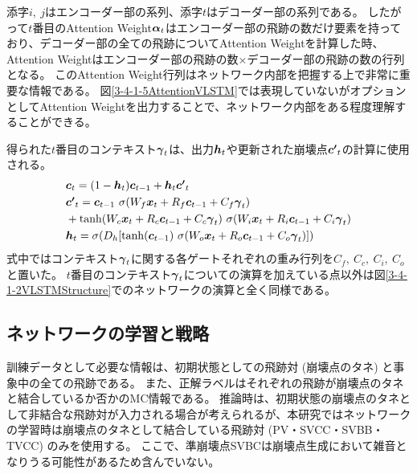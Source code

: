添字$i,\ j$はエンコーダー部の系列、添字$t$はデコーダー部の系列である。
したがって$t$番目のAttention Weight${\mbox{\boldmath{$\alpha$}}}_{t}$はエンコーダー部の飛跡の数だけ要素を持っており、デコーダー部の全ての飛跡についてAttention Weightを計算した時、Attention Weightはエンコーダー部の飛跡の数$\times$デコーダー部の飛跡の数の行列となる。
このAttention Weight行列はネットワーク内部を把握する上で非常に重要な情報である。
図\ref{3-4-1-5AttentionVLSTM}では表現していないがオプションとしてAttention Weightを出力することで、ネットワーク内部をある程度理解することができる。

得られた$t$番目のコンテキスト${\mbox{\boldmath{$\gamma$}}}_{t}$は、出力${\mbox{\boldmath{$h$}}}_{t}$や更新された崩壊点${\mbox{\boldmath{$c'$}}}_{t}$の計算に使用される。
\begin{equation}
 \begin{split}
  &{\mbox{\boldmath{$c$}}}_{t} 
  = (1-{\mbox{\boldmath{$h$}}}_t) {\mbox{\boldmath{$c$}}}_{t-1} + {\mbox{\boldmath{$h$}}}_t {\mbox{\boldmath{$c'$}}}_{t}\\
  &{\mbox{\boldmath{$c'$}}}_{t}
  = {\mbox{\boldmath{$c$}}}_{t-1} \  \sigma (W_f {\mbox{\boldmath{$x$}}}_t + R_f {\mbox{\boldmath{$c$}}}_{t-1} + C_f {\mbox{\boldmath{$\gamma$}}}_{t})\\
  &+ \tanh (W_c {\mbox{\boldmath{$x$}}}_t + R_c {\mbox{\boldmath{$c$}}}_{t-1} + C_c {\mbox{\boldmath{$\gamma$}}}_{t}) \  \sigma (W_i {\mbox{\boldmath{$x$}}}_t + R_i {\mbox{\boldmath{$c$}}}_{t-1} + C_i {\mbox{\boldmath{$\gamma$}}}_{t})\\
  &{\mbox{\boldmath{$h$}}}_{t} 
  = \sigma (D_h [\tanh({\mbox{\boldmath{$c$}}}_{t-1}) \  \sigma (W_o {\mbox{\boldmath{$x$}}}_t + R_o {\mbox{\boldmath{$c$}}}_{t-1} + C_o {\mbox{\boldmath{$\gamma$}}}_{t}) ])
 \end{split}
\end{equation}
式中ではコンテキスト${\mbox{\boldmath{$\gamma$}}}_{t}$に関する各ゲートそれぞれの重み行列を$C_f,\ C_c,\ C_i,\ C_o$と置いた。
$t$番目のコンテキスト${\mbox{\boldmath{$\gamma$}}}_{t}$についての演算を加えている点以外は図\ref{3-4-1-2VLSTMStructure}でのネットワークの演算と全く同様である。


\subsection{ネットワークの学習と戦略} \label{Net:VLSTM:TrainingandStrategyofVLSTM}

訓練データとして必要な情報は、初期状態としての飛跡対 (崩壊点のタネ) と事象中の全ての飛跡である。
また、正解ラベルはそれぞれの飛跡が崩壊点のタネと結合しているか否かのMC情報である。
推論時は、初期状態の崩壊点のタネとして非結合な飛跡対が入力される場合が考えられるが、本研究ではネットワークの学習時は崩壊点のタネとして結合している飛跡対 (PV・SVCC・SVBB・TVCC) のみを使用する。
ここで、準崩壊点SVBCは崩壊点生成において雑音となりうる可能性があるため含んでいない。

